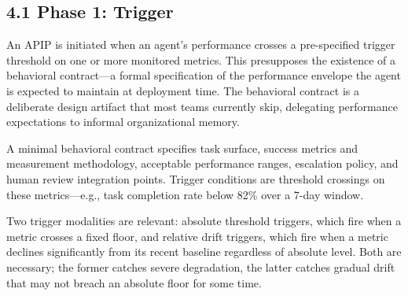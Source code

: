 \subsection{4.1  Phase 1: Trigger}

An APIP is initiated when an agent's performance crosses a pre-specified trigger threshold on one or more monitored metrics. This presupposes the existence of a behavioral contract---a formal specification of the performance envelope the agent is expected to maintain at deployment time. The behavioral contract is a deliberate design artifact that most teams currently skip, delegating performance expectations to informal organizational memory.

A minimal behavioral contract specifies task surface, success metrics and measurement methodology, acceptable performance ranges, escalation policy, and human review integration points. Trigger conditions are threshold crossings on these metrics---e.g., task completion rate below 82\% over a 7-day window.

Two trigger modalities are relevant: absolute threshold triggers, which fire when a metric crosses a fixed floor, and relative drift triggers, which fire when a metric declines significantly from its recent baseline regardless of absolute level. Both are necessary; the former catches severe degradation, the latter catches gradual drift that may not breach an absolute floor for some time.

